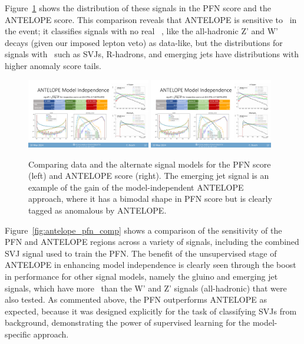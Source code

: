 Figure~\ref{fig:antelope_altsig} shows the distribution of these signals in the PFN score and the ANTELOPE score.
This comparison reveals that ANTELOPE is sensitive to \met~in the event; it classifies signals with no real \met~, like the all-hadronic Z' and W' decays (given our imposed lepton veto) as data-like, but the distributions for signals with \met~such as SVJs, R-hadrons, and emerging jets have distributions with higher anomaly score tails.
\begin{figure}[!htbp]
\centering
   \includegraphics[width=0.48\textwidth]{figures/ml/pfn_altsignals}
   \includegraphics[width=0.48\textwidth]{figures/ml/antelope_altsignals}
    \caption{Comparing data and the alternate signal models for the PFN score (left) and ANTELOPE score (right). The emerging jet signal is an example of the gain of the model-independent ANTELOPE approach, where it has a bimodal shape in PFN score but is clearly tagged as anomalous by ANTELOPE.
    \label{fig:antelope_altsig}}
\end{figure}

Figure~\ref{fig:antelope_pfn_comp} shows a comparison of the sensitivity of the PFN and ANTELOPE regions across a variety of signals, including the combined SVJ signal used to train the PFN.
The benefit of the unsupervised stage of ANTELOPE in enhancing model independence is clearly seen through the boost in performance for other signal models, namely the gluino and emerging jet signals, which have more \met~than the W' and Z' signals (all-hadronic) that were also tested. 
As commented above, the PFN outperforms ANTELOPE as expected, because it was designed explicitly for the task of classifying SVJs from background, demonstrating the power of supervised learning for the model-specific approach.

